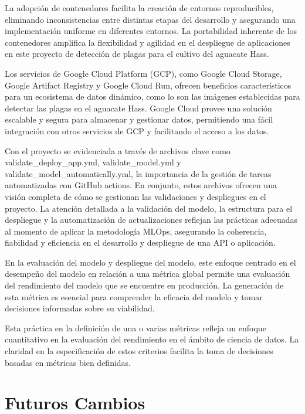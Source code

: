 La adopción de contenedores facilita la creación de entornos reproducibles, eliminando inconsistencias entre distintas etapas del desarrollo y asegurando una implementación uniforme en diferentes entornos. La portabilidad inherente de los contenedores amplifica la flexibilidad y agilidad en el despliegue de aplicaciones en este proyecto de detección de plagas para el cultivo del aguacate Hass.

Los servicios de Google Cloud Platform (GCP), como Google Cloud Storage, Google Artifact Registry y Google Cloud Run, ofrecen beneficios característicos para un ecosistema de datos dinámico, como lo son las imágenes establecidas para detectar las plagas en el aguacate Hass. Google Cloud provee una solución escalable y segura para almacenar y gestionar datos, permitiendo una fácil integración con otros servicios de GCP y facilitando el acceso a los datos. 

Con el proyecto se evidenciada a través de archivos clave como \\ validate\_deploy\_app.yml, validate\_model.yml y validate\_model\_automatically.yml, la importancia de la gestión de tareas automatizadas con GitHub actions. En conjunto, estos archivos ofrecen una visión completa de cómo se gestionan las validaciones y despliegues en el proyecto. La atención detallada a la validación del modelo, la estructura para el despliegue y la automatización de actualizaciones reflejan las prácticas adecuadas al momento de aplicar la metodología MLOps, asegurando la coherencia, fiabilidad y eficiencia en el desarrollo y despliegue de una API o aplicación.

En la evaluación del modelo y despliegue del modelo, este enfoque centrado en el desempeño del modelo en relación a una métrica global permite una evaluación del rendimiento del modelo que se encuentre en producción. La generación de esta métrica es esencial para comprender la eficacia del modelo y tomar decisiones informadas sobre su viabilidad. 

\newpage

Esta práctica en la definición de una o varias métricas refleja un enfoque cuantitativo en la evaluación del rendimiento en el ámbito de ciencia de datos. La claridad en la especificación de estos criterios facilita la toma de decisiones basadas en métricas bien definidas.


\section{Futuros Cambios}

